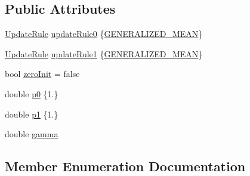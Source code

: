 \subsection*{Public Attributes}
\begin{DoxyCompactItemize}
\item 
\hyperlink{structnifty_1_1graph_1_1agglo_1_1NewPolicy_1_1SettingsType_accfaea9de6fc67aab372340c1982edcd}{Update\+Rule} \hyperlink{structnifty_1_1graph_1_1agglo_1_1NewPolicy_1_1SettingsType_a6f4de8a8fb7016f61e39ba51e9b98510}{update\+Rule0} \{\hyperlink{structnifty_1_1graph_1_1agglo_1_1NewPolicy_1_1SettingsType_accfaea9de6fc67aab372340c1982edcda2bbcc33cf0052f0d9dcf29bb93a804b0}{G\+E\+N\+E\+R\+A\+L\+I\+Z\+E\+D\+\_\+\+M\+E\+AN}\}
\item 
\hyperlink{structnifty_1_1graph_1_1agglo_1_1NewPolicy_1_1SettingsType_accfaea9de6fc67aab372340c1982edcd}{Update\+Rule} \hyperlink{structnifty_1_1graph_1_1agglo_1_1NewPolicy_1_1SettingsType_a916373b38d97d47f003c06b4384dc7bd}{update\+Rule1} \{\hyperlink{structnifty_1_1graph_1_1agglo_1_1NewPolicy_1_1SettingsType_accfaea9de6fc67aab372340c1982edcda2bbcc33cf0052f0d9dcf29bb93a804b0}{G\+E\+N\+E\+R\+A\+L\+I\+Z\+E\+D\+\_\+\+M\+E\+AN}\}
\item 
bool \hyperlink{structnifty_1_1graph_1_1agglo_1_1NewPolicy_1_1SettingsType_a7fea993c8c7ef90dbd52944563dcb63d}{zero\+Init} = false
\item 
double \hyperlink{structnifty_1_1graph_1_1agglo_1_1NewPolicy_1_1SettingsType_a025b23482a873dd935090ebb976a73f2}{p0} \{1.\}
\item 
double \hyperlink{structnifty_1_1graph_1_1agglo_1_1NewPolicy_1_1SettingsType_a8b111e990c73b02b5bc197221c4ec401}{p1} \{1.\}
\item 
double \hyperlink{structnifty_1_1graph_1_1agglo_1_1NewPolicy_1_1SettingsType_a4d77aeeae160fd3e947664f48348d21c}{gamma}
\end{DoxyCompactItemize}


\subsection{Member Enumeration Documentation}
\mbox{\label{structnifty_1_1graph_1_1agglo_1_1NewPolicy_1_1SettingsType_accfaea9de6fc67aab372340c1982edcd}} 
